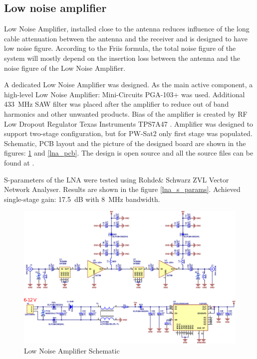 \subsection{Low noise amplifier}
Low Noise Amplifier, installed close to the antenna reduces influence of the long cable attenuation between the antenna and the receiver and is designed to have low noise figure. According to the Friis formula, the total noise figure of the system will mostly depend on the insertion loss between the antenna and the noise figure of the Low Noise Amplifier. 

A dedicated Low Noise Amplifier was designed. As the main active component, a high-level Low Noise Amplifier: Mini-Circuits PGA-103+ \cite{lna_pga_datasheet} was used. Additional \SI{433}{\MHz} SAW filter was placed after the amplifier to reduce out of band harmonics and other unwanted products. Bias of the amplifier is created by RF Low Dropout Regulator Texas Instruments TPS7A47 \cite{lna_ldo_datasheet}. Amplifier was designed to support two-stage configuration, but for PW-Sat2 only first stage was populated. Schematic, PCB layout and the picture of the designed board are shown in the figures: \ref{lna_schematic} and \ref{lna_pcb}. The design is open source and all the source files can be found at \cite{lna_github}.

S-parameters of the LNA were tested using Rohde\& Schwarz ZVL Vector Network Analyser. Results are shown in the figure \ref{lna_s_params}. Achieved single-stage gain: \SI{17.5}{\dB} with \SI{8}{\MHz} bandwidth.

\begin{landscape}
\begin{figure}
    \centering
    \includegraphics[width=1.12\paperwidth]{img/5/lna_schematic.eps}
    \caption{Low Noise Amplifier Schematic}
    \label{lna_schematic}
\end{figure}
\end{landscape}

